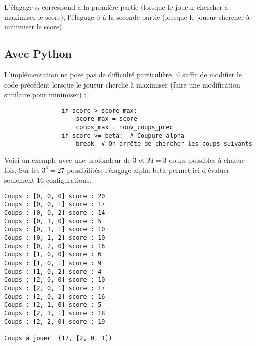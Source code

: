 \documentclass[11pt,class=report,crop=false]{standalone}
\begin{document}
L'élagage $\alpha$ correspond à la première partie (lorsque le joueur chercher à maximiser le score), l'élagage $\beta$ à la seconde partie (lorsque le joueur chercher à minimiser le score).
	
	
\subsection{Avec Python}

L'implémentation ne pose pas de difficulté particulière, il suffit de modifier le code précédent lorsque le joueur cherche à maximiser (faire une modification similaire pour minimiser) :
\begin{lstlisting}
				if score > score_max:
					score_max = score
					coups_max = nouv_coups_prec
				if score >= beta:  # Coupure alpha
					break  # On arrête de chercher les coups suivants
\end{lstlisting}


%

Voici un exemple avec une profondeur de $3$ et $M=3$ coups possibles à chaque fois.
Sur les $3^3 = 27$ possibilités, l'élagage alpha-beta permet ici d'évaluer seulement $16$ configurations.



\begin{lstlisting}
Coups : [0, 0, 0] score : 20 
Coups : [0, 0, 1] score : 17 
Coups : [0, 0, 2] score : 14
Coups : [0, 1, 0] score : 5
Coups : [0, 1, 1] score : 10 
Coups : [0, 1, 2] score : 10 
Coups : [0, 2, 0] score : 16
Coups : [1, 0, 0] score : 6 
Coups : [1, 0, 1] score : 9
Coups : [1, 0, 2] score : 4
Coups : [2, 0, 0] score : 10 
Coups : [2, 0, 1] score : 17 
Coups : [2, 0, 2] score : 16
Coups : [2, 1, 0] score : 5 
Coups : [2, 1, 1] score : 18
Coups : [2, 2, 0] score : 19

Coups à jouer  (17, [2, 0, 1])	
\end{lstlisting}


\end{document}
